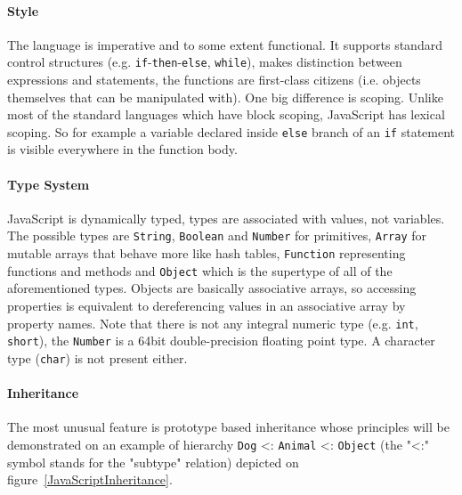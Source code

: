 \documentclass[12pt,a4paper]{report}
\begin{document}
\paragraph{Style} The language is imperative and to some extent functional. It supports standard control structures (e.g. \texttt{if}-\texttt{then}-\texttt{else}, \texttt{while}), makes distinction between expressions and statements, the functions are first-class citizens (i.e. objects themselves that can be manipulated with). One big difference is scoping. Unlike most of the standard languages which have block scoping, JavaScript has lexical scoping. So for example a variable declared inside \texttt{else} branch of an \texttt{if} statement is visible everywhere in the function body.

\paragraph{Type System} JavaScript is dynamically typed, types are associated with values, not variables. The possible types are \texttt{String}, \texttt{Boolean} and \texttt{Number} for primitives, \texttt{Array} for mutable arrays that behave more like hash tables, \texttt{Function} representing functions and methods and \texttt{Object} which is the supertype of all of the aforementioned types. Objects are basically associative arrays, so accessing properties is equivalent to dereferencing values in an associative array by property names. Note that there is not any integral numeric type (e.g. \texttt{int}, \texttt{short}), the \texttt{Number} is a 64bit double-precision floating point type. A character type (\texttt{char}) is not present either.

\paragraph{Inheritance} The most unusual feature is prototype based inheritance whose principles will be demonstrated on an example of hierarchy \texttt{Dog} \textless: \texttt{Animal} \textless: \texttt{Object} (the "\textless:" symbol stands for the "subtype" relation) depicted on figure~\ref{JavaScriptInheritance}. 
\end{document}
